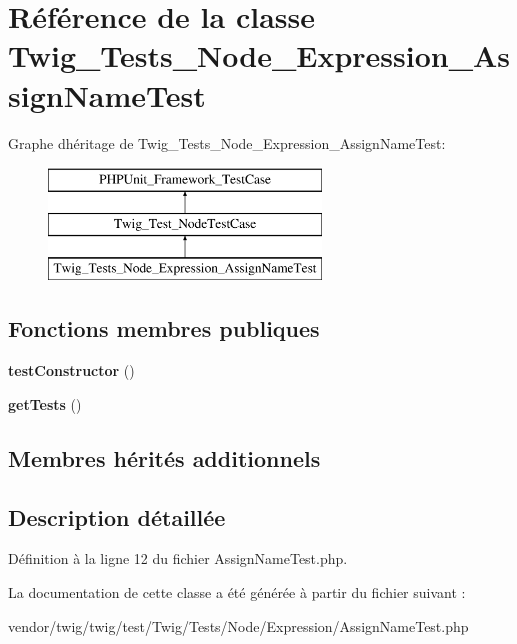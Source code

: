 \hypertarget{class_twig___tests___node___expression___assign_name_test}{}\section{Référence de la classe Twig\+\_\+\+Tests\+\_\+\+Node\+\_\+\+Expression\+\_\+\+Assign\+Name\+Test}
\label{class_twig___tests___node___expression___assign_name_test}
Graphe d\textquotesingle{}héritage de Twig\+\_\+\+Tests\+\_\+\+Node\+\_\+\+Expression\+\_\+\+Assign\+Name\+Test\+:\begin{figure}[H]
\begin{center}
\leavevmode
\includegraphics[height=3.000000cm]{class_twig___tests___node___expression___assign_name_test}
\end{center}
\end{figure}
\subsection*{Fonctions membres publiques}
\begin{DoxyCompactItemize}
\item 
{\bfseries test\+Constructor} ()\hypertarget{class_twig___tests___node___expression___assign_name_test_a47094dc941e72950570900d1418f89c6}{}\label{class_twig___tests___node___expression___assign_name_test_a47094dc941e72950570900d1418f89c6}

\item 
{\bfseries get\+Tests} ()\hypertarget{class_twig___tests___node___expression___assign_name_test_a7e247dd31cc8d37a6c97353a062a0080}{}\label{class_twig___tests___node___expression___assign_name_test_a7e247dd31cc8d37a6c97353a062a0080}

\end{DoxyCompactItemize}
\subsection*{Membres hérités additionnels}


\subsection{Description détaillée}


Définition à la ligne 12 du fichier Assign\+Name\+Test.\+php.



La documentation de cette classe a été générée à partir du fichier suivant \+:\begin{DoxyCompactItemize}
\item 
vendor/twig/twig/test/\+Twig/\+Tests/\+Node/\+Expression/Assign\+Name\+Test.\+php\end{DoxyCompactItemize}
